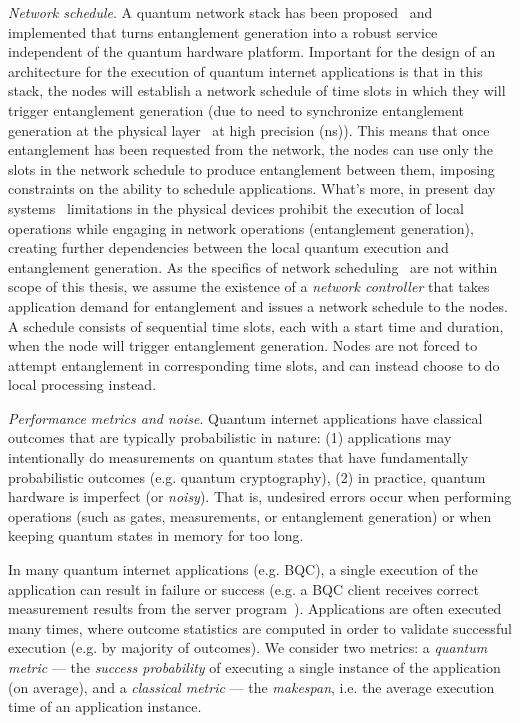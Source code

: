 \textit{Network schedule}.
A quantum network stack has been proposed~\cite{dahlberg2019link} and implemented \cite{pompili2022experimental} that turns entanglement generation into a robust service independent of the quantum hardware platform.
Important for the design of an architecture for the execution of quantum internet applications is that in this stack, the nodes will establish a network schedule of time slots in which they will trigger entanglement generation (due to need to synchronize entanglement generation at the physical layer~\cite{dahlberg2019link} at high precision (ns)).
This means that once entanglement has been requested from the network, the nodes can use only the slots in the network schedule to produce entanglement between them, imposing constraints on the ability to schedule applications. What's more, in present day systems~\cite{pompili2021realization, krutyanskiy2023entanglement} limitations in the physical devices prohibit the execution of local operations while engaging in network operations (entanglement generation), creating further dependencies between the local quantum execution and entanglement generation. 
As the specifics of network scheduling~\cite{network-scheduling, skrzypczyk2021architecture} are not within scope of this thesis,
we assume the existence of a \textit{network controller} that takes application demand for entanglement and issues a network schedule to the nodes. 
A schedule consists of sequential time slots, each with a start time and duration, when the node will trigger entanglement generation.
Nodes are not forced to attempt entanglement in corresponding time slots, and can instead choose to do local processing instead.


\textit{Performance metrics and noise}. Quantum internet applications have classical outcomes that are typically probabilistic in nature:
(1) applications may intentionally do measurements on quantum states that have fundamentally probabilistic outcomes (e.g. quantum cryptography),
(2) in practice, quantum hardware is imperfect (or \textit{noisy}). That is, undesired errors occur
when performing operations (such as gates, measurements, or entanglement generation) or when keeping quantum states in memory for too long.

In many quantum internet applications (e.g. BQC), a single execution of the application can result in failure or success (e.g. a BQC client receives correct measurement results from the server program~\cite{leichtle2021verifying}). Applications are often executed many times, where outcome statistics are computed in order to validate successful execution (e.g. by majority of outcomes).
We consider two metrics:
a \emph{quantum metric} --- the \textit{success probability} of executing a single instance of the application (on average), and a \emph{classical metric} --- the \textit{makespan}, i.e. the average execution time of an application instance.

